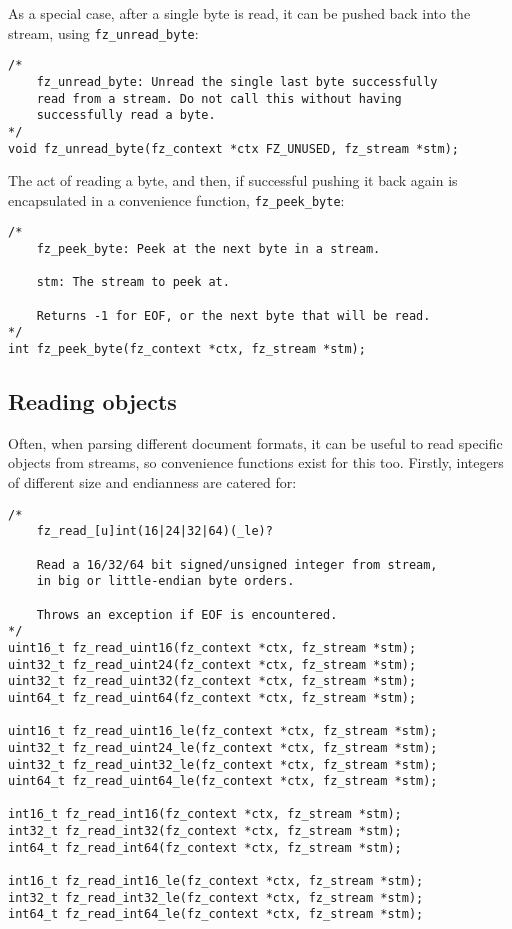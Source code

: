 \documentclass[oneside]{book}
\begin{document}
As a special case, after a single byte is read, it can be pushed back into the stream, using \texttt{fz\_unread\_byte}:

\begin{lstlisting}
/*
	fz_unread_byte: Unread the single last byte successfully
	read from a stream. Do not call this without having
	successfully read a byte.
*/
void fz_unread_byte(fz_context *ctx FZ_UNUSED, fz_stream *stm);
\end{lstlisting}

The act of reading a byte, and then, if successful pushing it back again is encapsulated in a convenience function, \texttt{fz\_peek\_byte}:

\begin{lstlisting}
/*
	fz_peek_byte: Peek at the next byte in a stream.

	stm: The stream to peek at.

	Returns -1 for EOF, or the next byte that will be read.
*/
int fz_peek_byte(fz_context *ctx, fz_stream *stm);
\end{lstlisting}

\subsection{Reading objects}

Often, when parsing different document formats, it can be useful to read specific objects from streams, so convenience functions exist for this too. Firstly, integers of different size and endianness are catered for:

\begin{lstlisting}
/*
	fz_read_[u]int(16|24|32|64)(_le)?

	Read a 16/32/64 bit signed/unsigned integer from stream,
	in big or little-endian byte orders.

	Throws an exception if EOF is encountered.
*/
uint16_t fz_read_uint16(fz_context *ctx, fz_stream *stm);
uint32_t fz_read_uint24(fz_context *ctx, fz_stream *stm);
uint32_t fz_read_uint32(fz_context *ctx, fz_stream *stm);
uint64_t fz_read_uint64(fz_context *ctx, fz_stream *stm);

uint16_t fz_read_uint16_le(fz_context *ctx, fz_stream *stm);
uint32_t fz_read_uint24_le(fz_context *ctx, fz_stream *stm);
uint32_t fz_read_uint32_le(fz_context *ctx, fz_stream *stm);
uint64_t fz_read_uint64_le(fz_context *ctx, fz_stream *stm);

int16_t fz_read_int16(fz_context *ctx, fz_stream *stm);
int32_t fz_read_int32(fz_context *ctx, fz_stream *stm);
int64_t fz_read_int64(fz_context *ctx, fz_stream *stm);

int16_t fz_read_int16_le(fz_context *ctx, fz_stream *stm);
int32_t fz_read_int32_le(fz_context *ctx, fz_stream *stm);
int64_t fz_read_int64_le(fz_context *ctx, fz_stream *stm);
\end{lstlisting}
\end{document}
